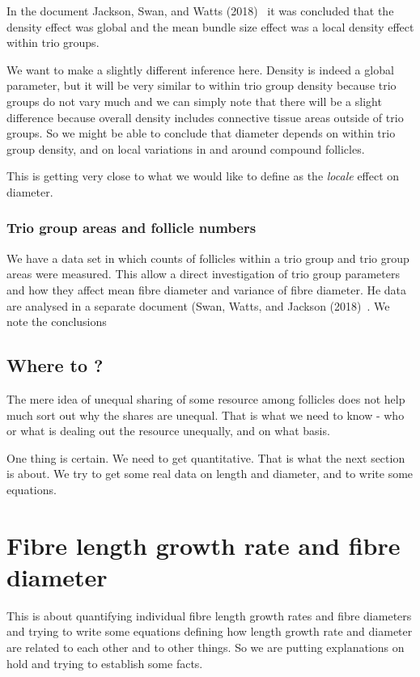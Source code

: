 \documentclass[titlepage]{article}  %
\begin{document}
In the document Jackson, Swan, and Watts (2018)~\cite{jack:18c}  it was concluded that the density effect was global and the mean bundle size effect was a local density effect within trio groups.

We want to make a slightly different inference here.  Density is indeed a global parameter, but it will be very similar to within trio group density because trio groups do not vary much and we can simply note that there will be a slight difference because overall density includes connective tissue areas outside of trio groups. So we might be able to conclude that diameter depends on within trio group density, and on local variations in and around compound follicles. 

This is getting very close to what we would like to define as the {\em locale} effect on diameter.

\subsubsection{Trio group areas and follicle numbers}
We have a data set in which counts of follicles within a trio group and trio group areas were measured. This allow a direct investigation of trio group parameters and how they affect mean fibre diameter and variance of fibre diameter. He data are analysed in a separate document (Swan, Watts, and Jackson (2018)~\cite{swan:18}. We note the conclusions


\subsection{Where to ?}
The mere idea of unequal sharing of some resource among follicles does not help much sort out why the shares are unequal. That is what we need to know - who or what is dealing out the resource unequally, and on what basis.

One thing is certain. We need to get quantitative.  That is what the next section is about. We try to get some real data on length and diameter, and to write some equations.

\section{Fibre length growth rate and fibre diameter}
This is about quantifying individual fibre length growth rates and fibre diameters and trying to write some equations defining how length growth rate and diameter are related to each other and to other things. So we are putting explanations on hold and trying to establish some facts.
\end{document}
